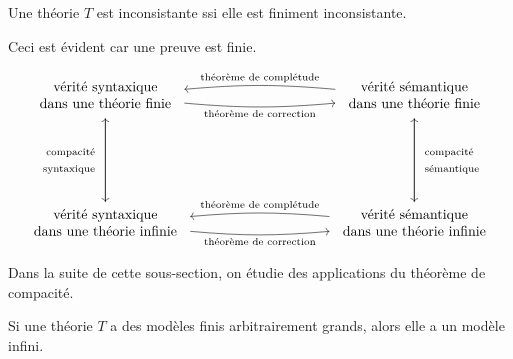 \documentclass[./main]{subfiles}
\begin{document}
  \begin{thm}
    Une théorie $T$ est inconsistante ssi elle est finiment inconsistante.
  \end{thm}
  \begin{prv}
    Ceci est évident car une preuve est finie.
  \end{prv}

  \vspace{-2\baselineskip}

  \[
  \begin{tikzcd}[column sep=100, row sep=60]
    \begin{array}{c}
      \text{vérité syntaxique}\\
      \text{dans une théorie finie}
    \end{array}
    \arrow[swap]{d}{\begin{array}{r}\text{compacité}\\\text{syntaxique}\end{array}}
    \arrow[bend right=5,swap]{r}{\text{théorème de correction}}&
    \arrow[bend right=5,swap]{l}{\text{théorème de complétude}}
    \begin{array}{c}
      \text{vérité sémantique}\\
      \text{dans une théorie finie}
    \end{array}
    \arrow{d}{\begin{array}{l}\text{compacité}\\\text{sémantique}\end{array}}\\
    \arrow{u}{}
    \begin{array}{c}
      \text{vérité syntaxique}\\
      \text{dans une théorie infinie}
    \end{array}
    \arrow[bend right=5,swap]{r}{\text{théorème de correction}}&
    \arrow[bend right=5,swap]{l}{\text{théorème de complétude}}
    \begin{array}{c}
      \text{vérité sémantique}\\
      \text{dans une théorie infinie}
    \end{array}
    \arrow{u}{}
  \end{tikzcd}
  \]

  Dans la suite de cette sous-section, on étudie des applications du théorème de compacité.

  \begin{thm}
    Si une théorie $T$ a des modèles finis arbitrairement grands, alors elle a un modèle infini.
  \end{thm}
\end{document}
